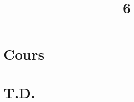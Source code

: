 \documentclass[a4paper]{article}
\title{6}{Séries de fonctions}
\begin{document}
	\part{Cours}
	
	\clearpage\null\clearpage
	\renewcommand{\thesection}{}
	\renewcommand{\thesubsection}{}
	\part{T.D.}
\end{document}
